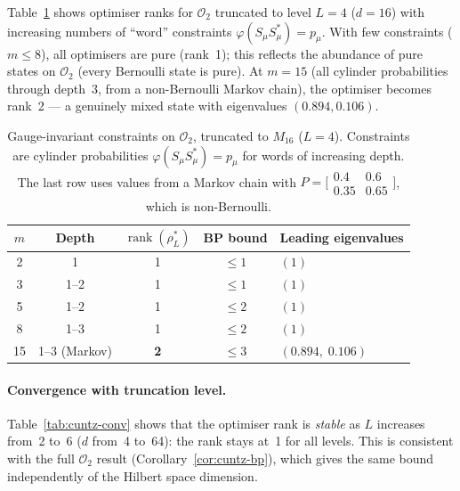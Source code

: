 \documentclass[11pt,a4paper]{article}
\theoremstyle{definition}
\newcommand{\rank}{\operatorname{rank}}
\begin{document}
Table~\ref{tab:cuntz-gauge} shows optimiser ranks for
$\mathcal{O}_2$ truncated to level $L = 4$ ($d = 16$) with
increasing numbers of ``word'' constraints
$\varphi(S_\mu S_\mu^*) = p_\mu$.  With few constraints
($m \leq 8$), all optimisers are pure (rank~1); this reflects
the abundance of pure states on $\mathcal{O}_2$ (every
Bernoulli state is pure).  At $m = 15$ (all cylinder
probabilities through depth~3, from a non-Bernoulli Markov chain),
the optimiser becomes rank~2 --- a genuinely mixed state
with eigenvalues $(0.894, 0.106)$.

\begin{table}[htbp]
\centering
\caption{Gauge-invariant constraints on $\mathcal{O}_2$, truncated
to $M_{16}$ ($L = 4$).  Constraints are cylinder probabilities
$\varphi(S_\mu S_\mu^*) = p_\mu$ for words of increasing depth.
The last row uses values from a Markov chain with
$P = \bigl[\begin{smallmatrix}0.4 & 0.6 \\ 0.35 & 0.65
\end{smallmatrix}\bigr]$, which is non-Bernoulli.}
\label{tab:cuntz-gauge}
\begin{tabular}{ccccl}
\toprule
$m$ & Depth & $\rank(\rho^*_L)$ & BP bound
  & \textbf{Leading eigenvalues} \\
\midrule
 2 & 1 & 1 & $\leq 1$ & $(1)$ \\
 3 & 1--2 & 1 & $\leq 1$ & $(1)$ \\
 5 & 1--2 & 1 & $\leq 2$ & $(1)$ \\
 8 & 1--3 & 1 & $\leq 2$ & $(1)$ \\
15 & 1--3 (Markov) & \textbf{2} & $\leq 3$ & $(0.894,\; 0.106)$ \\
\bottomrule
\end{tabular}
\end{table}

\paragraph{Convergence with truncation level.}

Table~\ref{tab:cuntz-conv} shows that the optimiser rank is
\emph{stable} as $L$ increases from~2 to~6
($d$ from~4 to~64): the rank stays at~1 for all levels.
This is consistent with the full $\mathcal{O}_2$ result
(Corollary~\ref{cor:cuntz-bp}), which gives the same bound
independently of the Hilbert space dimension.
\end{document}

